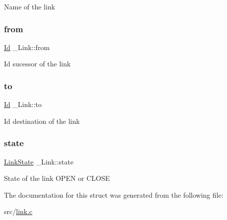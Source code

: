 Name of the link \mbox{\label{struct__Link_ae33a61999d11b202a1e1af285aaa84b0}} 
\subsubsection{\texorpdfstring{from}{from}}
{\footnotesize\ttfamily \hyperlink{types_8h_a845e604fb28f7e3d97549da3448149d3}{Id} \+\_\+\+Link\+::from}

Id sucessor of the link \mbox{\label{struct__Link_a54563ccd62fdc5057f55fa8f205d928c}} 
\subsubsection{\texorpdfstring{to}{to}}
{\footnotesize\ttfamily \hyperlink{types_8h_a845e604fb28f7e3d97549da3448149d3}{Id} \+\_\+\+Link\+::to}

Id destination of the link \mbox{\label{struct__Link_a58ecee77b2af4dddadb7e8ff94fa0d15}} 
\subsubsection{\texorpdfstring{state}{state}}
{\footnotesize\ttfamily \hyperlink{link_8h_ab0033b911037fd995258d117e65461e0}{Link\+State} \+\_\+\+Link\+::state}

State of the link O\+P\+EN or C\+L\+O\+SE 

The documentation for this struct was generated from the following file\+:\begin{DoxyCompactItemize}
\item 
src/\hyperlink{link_8c}{link.\+c}\end{DoxyCompactItemize}
